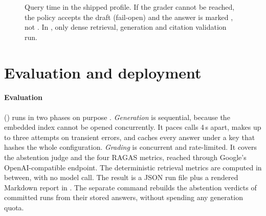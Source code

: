 \begin{figure}[htbp]
{}
\caption{Query time in the shipped  profile. If the grader cannot be reached, the policy accepts the draft (fail-open) and the answer is marked , not . In , only dense retrieval, generation and citation validation run.}
\label{fig:arch-query}
\end{figure}

\section{Evaluation and deployment}
\label{sec:arch-eval}

\paragraph{Evaluation} () runs in two phases on purpose . \emph{Generation} is sequential, because the embedded index cannot be opened concurrently. It paces calls 4\,s apart, makes up to three attempts on transient errors, and caches every answer under a key that hashes the whole configuration. \emph{Grading} is concurrent and rate-limited. It covers the abstention judge and the four RAGAS metrics, reached through Google's OpenAI-compatible endpoint. The deterministic retrieval metrics are computed in between, with no model call. The result is a JSON run file plus a rendered Markdown report in . The separate  command rebuilds the abstention verdicts of committed runs from their stored answers, without spending any generation quota.

